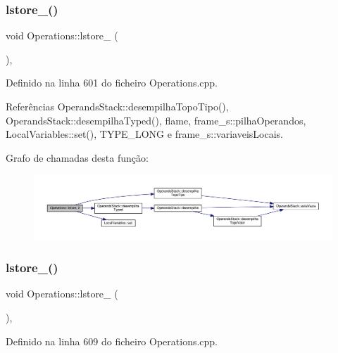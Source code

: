 \subsubsection{\texorpdfstring{lstore\+\_()}{lstore\_2()}}
{\footnotesize\ttfamily void Operations\+::lstore\+\_ (\begin{DoxyParamCaption}{ }\end{DoxyParamCaption})\hspace{0.3cm}{\ttfamily [static]}, {\ttfamily [private]}}



Definido na linha 601 do ficheiro Operations.\+cpp.



Referências Operands\+Stack\+::desempilha\+Topo\+Tipo(), Operands\+Stack\+::desempilha\+Typed(), flame, frame\+\_\+s\+::pilha\+Operandos, Local\+Variables\+::set(), T\+Y\+P\+E\+\_\+\+L\+O\+NG e frame\+\_\+s\+::variaveis\+Locais.

Grafo de chamadas desta função\+:
\nopagebreak
\begin{figure}[H]
\begin{center}
\leavevmode
\includegraphics[width=350pt]{classOperations_a178660c2b3ca2625c140daf867531386_cgraph}
\end{center}
\end{figure}
\mbox{\label{classOperations_a00d5ca7ea5a68e9cccfdc26b11a716bf}} 
\subsubsection{\texorpdfstring{lstore\+\_()}{lstore\_3()}}
{\footnotesize\ttfamily void Operations\+::lstore\+\_ (\begin{DoxyParamCaption}{ }\end{DoxyParamCaption})\hspace{0.3cm}{\ttfamily [static]}, {\ttfamily [private]}}



Definido na linha 609 do ficheiro Operations.\+cpp.



